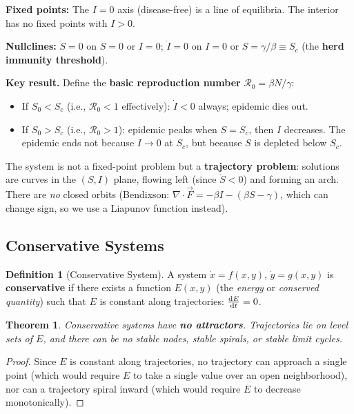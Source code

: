 \documentclass[11pt,letterpaper]{article}
\theoremstyle{definition}
\newtheorem{definition}{Definition}[section]
\theoremstyle{plain}
\newtheorem{theorem}{Theorem}[section]
\theoremstyle{remark}
\begin{document}
\textbf{Fixed points:} The $I=0$ axis (disease-free) is a line of
equilibria.  The interior has no fixed points with $I>0$.

\textbf{Nullclines:}  $\dot{S}=0$ on $S=0$ or $I=0$;
$\dot{I}=0$ on $I=0$ or $S = \gamma/\beta \equiv S_c$
(the \textbf{herd immunity threshold}).

\textbf{Key result.}  Define the \textbf{basic reproduction number}
$\mathcal{R}_0 = \beta N/\gamma$:
\begin{itemize}[leftmargin=2em]
  \item If $S_0 < S_c$ (i.e., $\mathcal{R}_0 < 1$ effectively):
    $\dot{I} < 0$ always; epidemic dies out.
  \item If $S_0 > S_c$ (i.e., $\mathcal{R}_0 > 1$): epidemic peaks
    when $S = S_c$, then $I$ decreases.  The epidemic ends not because
    $I \to 0$ at $S_c$, but because $S$ is depleted below $S_c$.
\end{itemize}

The system is not a fixed-point problem but a \textbf{trajectory problem}:
solutions are curves in the $(S,I)$ plane, flowing left (since
$\dot{S} < 0$) and forming an arch.  There are \emph{no} closed orbits
(Bendixson: $\nabla\cdot\vec{F} = -\beta I - (\beta S-\gamma)$, which
can change sign, so we use a Liapunov function instead).

\subsection{Conservative Systems}\label{sec:conservative}

\begin{definition}[Conservative System]
A system $\dot{x}=f(x,y)$, $\dot{y}=g(x,y)$ is \textbf{conservative} if
there exists a function $E(x,y)$ (the \emph{energy} or \emph{conserved
quantity}) such that $E$ is constant along trajectories:
$\dv{E}{t} = 0$.
\end{definition}

\begin{theorem}
Conservative systems have \textbf{no attractors}.  Trajectories lie on
level sets of $E$, and there can be no stable nodes, stable spirals, or
stable limit cycles.
\end{theorem}
\begin{proof}
Since $E$ is constant along trajectories, no trajectory can approach a
single point (which would require $E$ to take a single value over an open
neighborhood), nor can a trajectory spiral inward (which would require $E$ to
decrease monotonically).
\end{proof}
\end{document}
